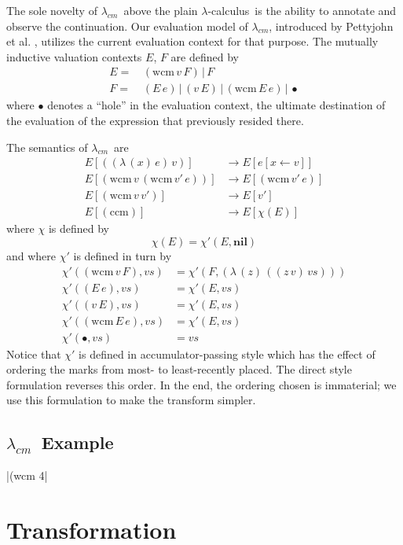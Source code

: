 \documentclass{llncs}
\newcommand{\cm}[0]{$\lambda_{cm}$}
\newcommand{\lc}[0]{$\lambda$-calculus}
\newcommand{\wcm}[2]{(\mathrm{wcm}\,#1\,#2)}
\newcommand{\ccm}[0]{(\mathrm{ccm})}
\newcommand{\app}[2]{(#1\,#2)}
\newcommand{\abs}[2]{(\lambda\,(#1)\,#2)}
\newcommand{\hole}[0]{\bullet}
\newcommand{\rr}[0]{\rightarrow}
\begin{document}
The sole novelty of \cm\ above the plain \lc\ is the ability to annotate and observe the continuation. Our evaluation model of \cm, introduced by Pettyjohn et al. \cite{pettyjohn2005continuations}, utilizes the current evaluation context for that purpose. The mutually inductive valuation contexts $E$, $F$ are defined by
\begin{align}
E=\, &\wcm{v}{F}\,|\,F\\
F=\, &\app{E}{e}\,|\,\app{v}{E}\,|\,\wcm{E}{e}\,|\,\hole
\end{align}
where $\hole$ denotes a ``hole'' in the evaluation context, the ultimate destination of the evaluation of the expression that previously resided there.

The semantics of \cm\ are
\begin{align}
E[\app{\abs{x}{e}}{v}]  &\rr E[e[x\leftarrow v]]\\
E[\wcm{v}{\wcm{v'}{e}}] &\rr E[\wcm{v'}{e}]\\
E[\wcm{v}{v'}]          &\rr E[v']\\
E[\ccm]                 &\rr E[\chi(E)]
\end{align}
where $\chi$ is defined by
\begin{equation}
\chi(E)=\chi'(E,\mathbf{nil})
\end{equation}
and where $\chi'$ is defined in turn by
\begin{align}
\chi'(\wcm{v}{F},vs) &= \chi'(F,\abs{z}{\app{\app{z}{v}}{vs}})\\
\chi'(\app{E}{e},vs) &= \chi'(E,vs)\\
\chi'(\app{v}{E},vs) &= \chi'(E,vs)\\
\chi'(\wcm{E}{e},vs) &= \chi'(E,vs)\\
\chi'(\hole,vs)      &= vs
\end{align}
Notice that $\chi'$ is defined in accumulator-passing style which has the effect of ordering the marks from most- to least-recently placed. The direct style formulation reverses this order. In the end, the ordering chosen is immaterial; we use this formulation to make the transform simpler.

\subsection{\cm\ Example}

\scheme|(wcm 4|

\section{Transformation}
\end{document}
